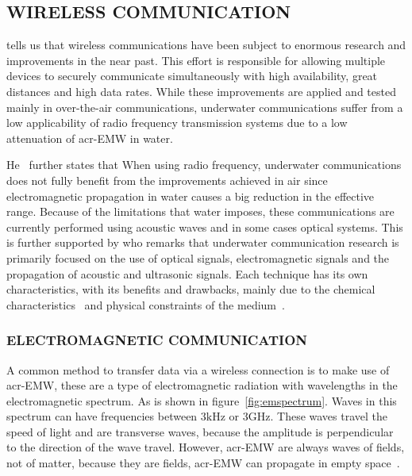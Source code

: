\subsection{WIRELESS COMMUNICATION}
\citet{freitas_evaluation_2014} tells us that wireless communications have been subject to enormous research and 
improvements in the near past. This effort is responsible for allowing multiple devices to securely communicate 
simultaneously with high availability, great distances and high data rates. While these improvements are applied and 
tested mainly in over-the-air communications, underwater communications suffer from a low applicability of radio 
frequency transmission systems due to a low attenuation of \gls{acr-EMW}  in water.

He~\cite{freitas_evaluation_2014} further states that When using radio frequency, underwater communications does not 
fully benefit from the improvements achieved in air since electromagnetic propagation in water causes a big reduction
in the effective range. Because of the limitations that water imposes, these communications are currently performed 
using acoustic waves and in some cases optical systems. This is further supported by \citet{lloret_underwater_2012} 
who remarks that underwater communication research is primarily focused on the use of optical signals, 
electromagnetic signals and the propagation of acoustic and ultrasonic signals.
Each technique has its own characteristics, with its benefits and drawbacks, mainly due to the chemical 
characteristics~\cite{garcia_underwater_2011} and physical constraints of the medium~\cite{lanbo_prospects_2008}.

\subsubsection{ELECTROMAGNETIC COMMUNICATION}\label{sec:em}
A common method to transfer data via a wireless connection is to make use of \gls{acr-EMW}, these are a type of 
electromagnetic radiation with wavelengths in the electromagnetic spectrum. As is shown in 
figure~\ref{fig:emspectrum}. Waves in this spectrum can have frequencies between \( 3 \si{\kilo\hertz} \) or \( 3 
\si{\giga\hertz} \).
These waves travel the speed of light and are transverse waves, because the amplitude is perpendicular to the 
direction of the wave travel. However, \gls{acr-EMW} are always waves of fields, not of matter, because they are 
fields, \gls{acr-EMW} can propagate in empty space~\cite{giancoli_physics_2015}.

